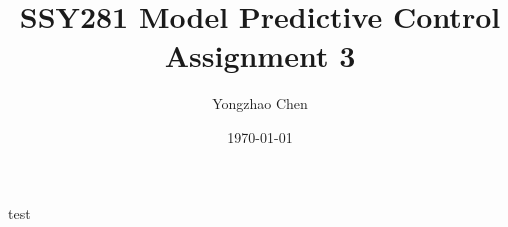 \documentclass[12pt]{article}
\title{\LARGE SSY281 Model Predictive Control \\  \vspace{1cm}\Large Assignment 3 \vspace{2cm}}
\author{Yongzhao Chen}
\date{\vspace{2cm}\today}
\begin{document}
\maketitle
\thispagestyle{empty}
\newpage
test




\end{document}
